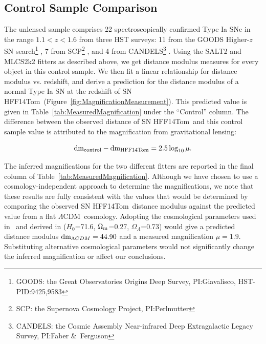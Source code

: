\documentclass[iop]{emulateapj}
\def\P14{\citetalias{Patel:2014}}
\def\tomas{HFF14Tom}
\def\Om{\ensuremath{\Omega_{\rm m}}}
\def\OL{\ensuremath{\Omega_{\Lambda}}}
\def\LCDM{$\Lambda$CDM}
\def\Ho{\ensuremath{H_0}}
\begin{document}
\subsection{Control Sample Comparison}
\label{sec:ControlSampleComparison}

The unlensed sample comprises 22 spectroscopically confirmed Type Ia
SNe in the range $1.1<z<1.6$ from three HST surveys: 11 from the GOODS Higher-$z$ SN search\footnote{GOODS: the Great Observatories Origins Deep Survey, PI:Giavalisco, HST-PID:9425,9583} \citep{Strolger:2004,Riess:2007}, 7 from SCP\footnote{SCP: the Supernova Cosmology Project, PI:Perlmutter} \citep{Suzuki:2012}, and 4 from CANDELS\footnote{CANDELS: the Cosmic Assembly Near-infrared Deep Extragalactic Legacy Survey, PI:Faber \&\ Ferguson} \citep{Rodney:2012,Rodney:2014}.  Using the SALT2 and MLCS2k2
fitters as described above, we get distance modulus measures for every
object in this control sample.  We then fit a linear relationship for
distance modulus vs. redshift, and derive a prediction for the
distance modulus of a normal Type Ia SN at the redshift of SN \tomas\
(Figure~\ref{fig:MagnificationMeasurement}).
This predicted value is given in
Table~\ref{tab:MeasuredMagnification} under the ``Control'' column.
The difference between the observed distance of SN \tomas\ and this
control sample value is attributed to the magnification from
gravitational lensing:

\begin{equation} \label{eqn:mu}
{\rm dm}_{\rm control} - {\rm dm}_{\rm \tomas} = 2.5 \log_{10}\mu.
\end{equation}

\noindent The inferred magnifications for the two different fitters are
reported in the final column of Table~\ref{tab:MeasuredMagnification}.
Although we have chosen to use a cosmology-independent approach to
determine the magnifications, we note that these results are fully
consistent with the values that would be determined by comparing the
observed SN \tomas\ distance modulus against the predicted value from
a flat \LCDM\ cosmology. Adopting the cosmological parameters used
in \P14\ and derived in \citet{Sullivan:2011}
(\Ho=71.6, \Om=0.27, \OL=0.73) would give a predicted distance modulus
${\rm dm}_{\Lambda CDM}=44.90$ and a measured magnification $\mu=1.9$.
Substituting alternative cosmological
parameters \citep[e.g.,][]{Betoule:2014,Planck:2015} would not
significantly change the inferred magnification or affect our
conclusions.
\end{document}
